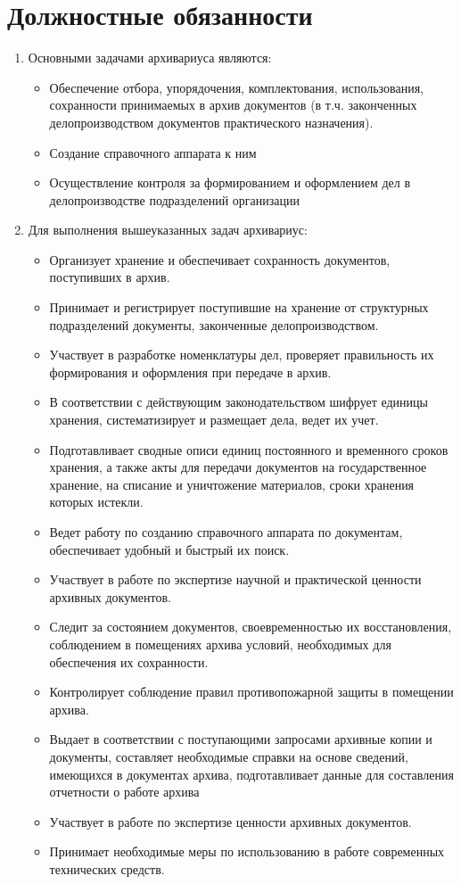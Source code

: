 \documentclass[a4paper,12pt]{article}
\begin{document}
\section{Должностные обязанности}

\begin{enumerate}
	\item Основными задачами архивариуса являются:
	\begin{itemize}
		\item Обеспечение отбора, упорядочения, комплектования, использования, сохранности принимаемых в архив документов (в т.ч. законченных делопроизводством документов практического назначения).
		\item Создание справочного аппарата к ним
		\item Осуществление контроля за формированием и оформлением дел в делопроизводстве подразделений организации
	\end{itemize}
	\item Для выполнения вышеуказанных задач архивариус:
	\begin{itemize}
		\item Организует хранение и обеспечивает сохранность документов, поступивших в архив.
		\item Принимает и регистрирует поступившие на хранение от структурных подразделений документы, законченные делопроизводством.
		\item Участвует в разработке номенклатуры дел, проверяет правильность их формирования и оформления при передаче в архив.
		\item В соответствии с действующим законодательством шифрует единицы хранения, систематизирует и размещает дела, ведет их учет.
		\item Подготавливает сводные описи единиц постоянного и временного сроков хранения, а также акты для передачи документов на государственное хранение, на списание и уничтожение материалов, сроки хранения которых истекли.
		\item Ведет работу по созданию справочного аппарата по документам, обеспечивает удобный и быстрый их поиск.
		\item Участвует в работе по экспертизе научной и практической ценности архивных документов.
		\item Следит за состоянием документов, своевременностью их восстановления, соблюдением в помещениях архива условий, необходимых для обеспечения их сохранности.
		\item Контролирует соблюдение правил противопожарной защиты в помещении архива.
		\item Выдает в соответствии с поступающими запросами архивные копии и документы, составляет необходимые справки на основе сведений, имеющихся в документах архива, подготавливает данные для составления отчетности о работе архива
		\item Участвует в работе по экспертизе ценности архивных документов.
		\item Принимает необходимые меры по использованию в работе современных технических средств.
	\end{itemize}

\end{enumerate}
\end{document}
